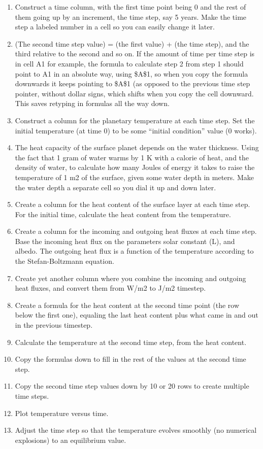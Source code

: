 \begin{enumerate}
	\item Construct a time column, with the first time point being 0 and the rest of them going up by an increment, the time step, say 5 years. Make the time step a labeled number in a cell so you can easily change it later. 
	\item (The second time step value) = (the first value) + (the time step), and the third relative to the second and so on. If the amount of time per time step is in cell A1 for example, the formula to calculate step 2 from step 1 should point to A1 in an absolute way, using {\$A\$1}, so when you copy the formula downwards it keeps pointing to {\$A\$1} (as opposed to the previous time step pointer, without dollar signs, which shifts when you copy the cell downward. This saves retyping in formulas all the way down.
	\item Construct a column for the planetary temperature at each time step. Set the initial temperature (at time 0) to be some “initial condition” value (0 works).
	\item The heat capacity of the surface planet depends on the water thickness. Using the fact that 1 gram of water warms by 1 K with a calorie of heat, and the density of water, to calculate how many Joules of energy it takes to raise the temperature of 1 m2 of the surface, given some water depth in meters. Make the water depth a separate cell so you dial it up and down later.
	\item Create a column for the heat content of the surface layer at each time step. For the initial time, calculate the heat content from the temperature.
	\item Create a column for the incoming and outgoing heat fluxes at each time step. Base the incoming heat flux on the parameters solar constant (L), and albedo. The outgoing heat flux is a function of the temperature according to the Stefan-Boltzmann equation.
	\item Create yet another column where you combine the incoming and outgoing heat fluxes, and convert them from W/m2 to J/m2 timestep.
	\item Create a formula for the heat content at the second time point (the row below the first one), equaling the last heat content plus what came in and out in the previous timestep.
	\item Calculate the temperature at the second time step, from the heat content.
	\item Copy the formulas down to fill in the rest of the values at the second time step.
	\item Copy the second time step values down by 10 or 20 rows to create multiple time steps.
	\item Plot temperature versus time.
	\item Adjust the time step so that the temperature evolves smoothly (no numerical explosions) to an equilibrium value.
\end{enumerate}

